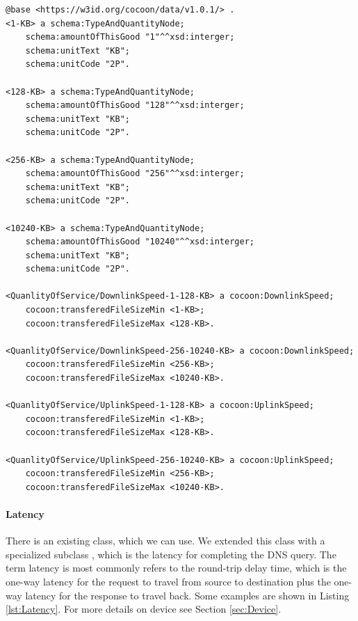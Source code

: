 \begin{lstlisting}[caption={QoS Properties},label={lst:QoSProperties}]
@base <https://w3id.org/cocoon/data/v1.0.1/> .
<1-KB> a schema:TypeAndQuantityNode;
    schema:amountOfThisGood "1"^^xsd:interger;
    schema:unitText "KB";
    schema:unitCode "2P".

<128-KB> a schema:TypeAndQuantityNode;
    schema:amountOfThisGood "128"^^xsd:interger;
    schema:unitText "KB";
    schema:unitCode "2P".

<256-KB> a schema:TypeAndQuantityNode;
    schema:amountOfThisGood "256"^^xsd:interger;
    schema:unitText "KB";
    schema:unitCode "2P".

<10240-KB> a schema:TypeAndQuantityNode;
    schema:amountOfThisGood "10240"^^xsd:interger;
    schema:unitText "KB";
    schema:unitCode "2P".

<QuanlityOfService/DownlinkSpeed-1-128-KB> a cocoon:DownlinkSpeed;
    cocoon:transferedFileSizeMin <1-KB>;
    cocoon:transferedFileSizeMax <128-KB>.

<QuanlityOfService/DownlinkSpeed-256-10240-KB> a cocoon:DownlinkSpeed;
    cocoon:transferedFileSizeMin <256-KB>;
    cocoon:transferedFileSizeMax <10240-KB>.

<QuanlityOfService/UplinkSpeed-1-128-KB> a cocoon:UplinkSpeed;
    cocoon:transferedFileSizeMin <1-KB>;
    cocoon:transferedFileSizeMax <128-KB>.

<QuanlityOfService/UplinkSpeed-256-10240-KB> a cocoon:UplinkSpeed;
    cocoon:transferedFileSizeMin <256-KB>;
    cocoon:transferedFileSizeMax <10240-KB>.
\end{lstlisting}

\paragraph{Latency}
There is an existing  class, which we can use.
We extended this class with a specialized subclass ,
which is the latency for completing the DNS query.
The term latency is most commonly refers to the round-trip delay time,
which is the one-way latency for the request to travel from source to destination plus the one-way latency for the response to travel back.
Some examples are shown in Listing \ref{lst:Latency}.
For more details on device see Section \ref{sec:Device}.


